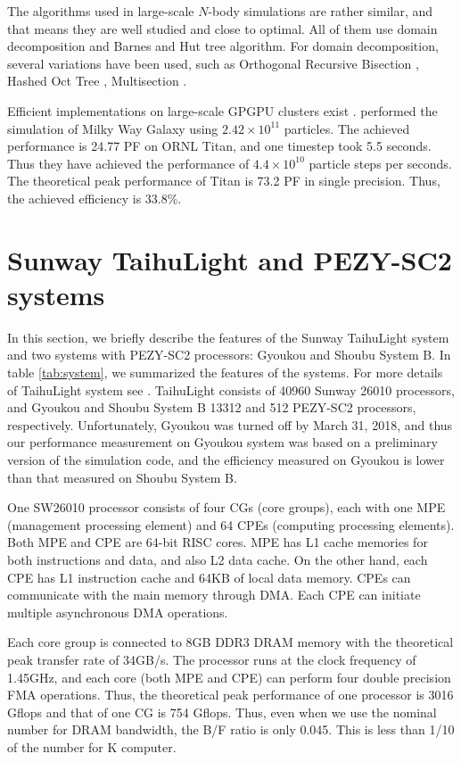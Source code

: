 \documentclass[Afour,sageh,times]{sagej}
\newcommand{\rev}[1]{{#1}}
\begin{document}
The algorithms used in large-scale $N$-body simulations are rather
similar, and that means they are well studied and close to optimal.
All of them use domain decomposition and Barnes and Hut tree
algorithm. For domain decomposition, several variations have been
used, such as Orthogonal Recursive Bisection \citep{Salmon1990},
Hashed Oct Tree \citep{WarrenSalmon1992}, Multisection
\citep{Makino2004}.


Efficient implementations on large-scale GPGPU clusters exist
\citep{Hamadaetal2009, PortegiesZwartetal2014, Bedorfetal2014}.
\citet{Bedorfetal2014} performed the simulation of Milky Way Galaxy
using $2.42 \times 10^{11}$ particles. The achieved performance is
24.77 PF on ORNL Titan, and one timestep took 5.5 seconds. Thus they
have achieved the performance of $4.4 \times 10^{10}$ particle steps
per seconds. The theoretical peak performance of Titan is 73.2 PF in
single precision. Thus, the achieved efficiency is 33.8\%.

\section{Sunway TaihuLight and PEZY-SC2 systems}
\label{sect:hardware}

In this section, we briefly describe the features of the Sunway
TaihuLight system and two systems with PEZY-SC2 processors: Gyoukou
and Shoubu System B. \rev{In table \ref{tab:system}, we summarized the
  features of the systems.} For more details of TaihuLight system see
\citet{Fu2016}. TaihuLight consists of 40960 Sunway 26010 processors,
and Gyoukou and Shoubu System B 13312 and 512 PEZY-SC2 processors,
respectively. Unfortunately, Gyoukou was turned off by March 31, 2018,
and thus our performance measurement on Gyoukou system was based on a
preliminary version of the simulation code, and the efficiency
measured on Gyoukou is lower than that measured on Shoubu System B.

One SW26010 processor consists of four CGs (core groups), each with
one MPE (management processing element) and 64 CPEs (computing
processing elements). Both MPE and CPE are 64-bit RISC cores. MPE has
L1 cache memories for both instructions and data, and also L2 data
cache. On the other hand, each CPE has L1 instruction cache and 64KB
of local data memory. CPEs can communicate with the main memory
through DMA.  Each CPE can initiate multiple asynchronous DMA
operations.

Each core group is connected to 8GB DDR3 DRAM memory with the theoretical
peak transfer rate of 34GB/s. The processor runs at the clock
frequency of 1.45GHz, and each core (both MPE and CPE) can perform
four double precision FMA operations. Thus, the theoretical peak
performance of one processor is 3016 Gflops and that of one CG is 754
Gflops. Thus, even when we use the nominal number for DRAM bandwidth,
the B/F ratio is only 0.045. This is less than 1/10 of the number for
K computer.
\end{document}

